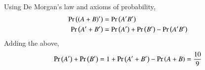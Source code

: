    Using De Morgan's law and axioms of probability,
\begin{align}
\Pr\left(\left(A+B\right)^\prime \right) &=\Pr\left(A^\prime B^\prime \right)  \\
\Pr\left(A^\prime  + B^\prime \right) &= \Pr\left(A^\prime \right) + \Pr\left(B^\prime \right) - \Pr\left(A^\prime B^\prime \right)
\end{align}
Adding the above, 
\begin{align}
	\Pr\left(A^\prime \right) + \Pr\left(B^\prime \right)  = 1+\Pr\left(A^\prime  + B^\prime \right)-\Pr\left(A+B\right)
	=\frac{10}{9}
\end{align}
